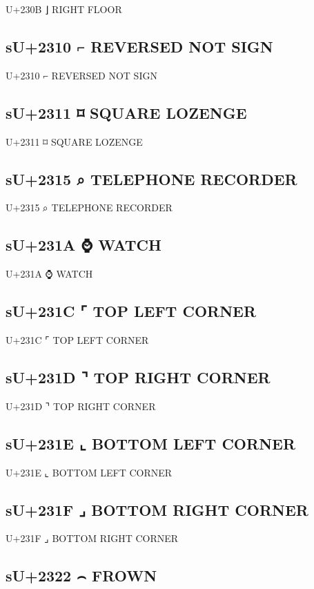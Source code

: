 U+230B ⌋ RIGHT FLOOR

\subsection{sU+2310 ⌐ REVERSED NOT SIGN}

U+2310 ⌐ REVERSED NOT SIGN

\subsection{sU+2311 ⌑ SQUARE LOZENGE}

U+2311 ⌑ SQUARE LOZENGE

\subsection{sU+2315 ⌕ TELEPHONE RECORDER}

U+2315 ⌕ TELEPHONE RECORDER

\subsection{sU+231A ⌚ WATCH}

U+231A ⌚ WATCH

\subsection{sU+231C ⌜ TOP LEFT CORNER}

U+231C ⌜ TOP LEFT CORNER

\subsection{sU+231D ⌝ TOP RIGHT CORNER}

U+231D ⌝ TOP RIGHT CORNER

\subsection{sU+231E ⌞ BOTTOM LEFT CORNER}

U+231E ⌞ BOTTOM LEFT CORNER

\subsection{sU+231F ⌟ BOTTOM RIGHT CORNER}

U+231F ⌟ BOTTOM RIGHT CORNER

\subsection{sU+2322 ⌢ FROWN}


